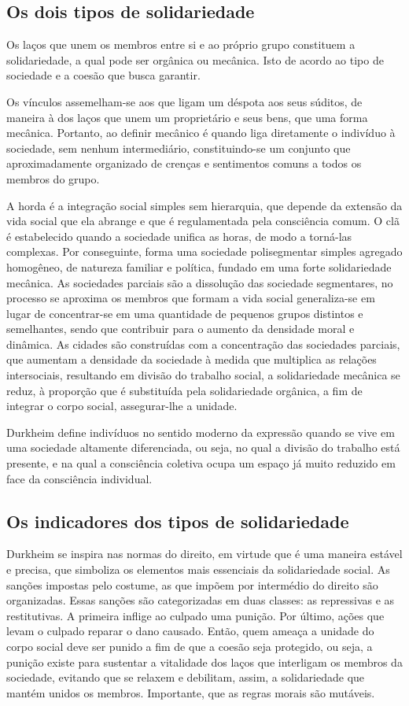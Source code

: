 \subsection{Os dois tipos de solidariedade}

Os laços que unem os membros entre si e ao próprio grupo constituem a solidariedade, a qual pode ser orgânica ou mecânica. 
Isto de acordo ao tipo de sociedade e a coesão que busca garantir. 

Os vínculos assemelham-se aos que ligam um déspota aos seus súditos, de maneira à dos laços que unem um proprietário e seus bens, que uma forma mecânica.
Portanto, ao definir mecânico é quando liga diretamente o indivíduo à sociedade, sem nenhum intermediário, constituindo-se um conjunto que aproximadamente organizado de crenças e sentimentos comuns a todos os membros do grupo.

A horda é a integração social simples sem hierarquia, que depende da extensão da vida social que ela abrange e que é regulamentada pela consciência comum.
O clã é estabelecido quando a sociedade unifica as horas, de modo a torná-las complexas.
Por conseguinte,  forma uma sociedade polisegmentar simples agregado homogêneo, de natureza familiar e política, fundado em uma forte solidariedade mecânica.
As sociedades parciais são a dissolução das sociedade segmentares, no processo se aproxima os membros que formam a vida social generaliza-se em lugar de concentrar-se em uma quantidade  de pequenos grupos distintos e semelhantes, sendo que contribuir para o aumento da densidade moral e dinâmica.
As cidades são construídas com a concentração das sociedades parciais, que aumentam a densidade da sociedade à medida que multiplica as relações intersociais, resultando em divisão do trabalho social, a solidariedade mecânica se reduz, à proporção que é substituída pela solidariedade orgânica, a fim de integrar o corpo social, assegurar-lhe a unidade.

Durkheim define indivíduos no sentido moderno da expressão quando se vive em uma sociedade altamente diferenciada, ou seja, no qual a divisão do trabalho está presente, e na qual a consciência coletiva ocupa um espaço já muito reduzido em face da consciência individual.  


\subsection{Os indicadores dos tipos de solidariedade}

Durkheim se inspira nas normas do direito, em virtude que é uma maneira estável e precisa, que simboliza os elementos mais essenciais da solidariedade social.
As sanções impostas pelo costume, as que impõem por intermédio do direito são organizadas.
Essas sanções são categorizadas em duas classes: as repressivas e as restitutivas.
A primeira inflige ao culpado uma punição. 
Por último, ações que levam o culpado reparar o dano causado.
Então, quem ameaça a unidade do corpo social deve ser punido a fim de que a coesão seja protegido, ou seja, a punição existe para sustentar a vitalidade dos laços que interligam os membros da sociedade, evitando que se relaxem e debilitam, assim, a solidariedade que mantém unidos os membros. 
Importante, que as regras morais são mutáveis.

